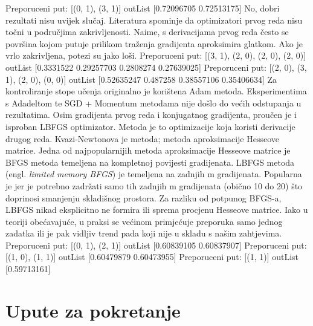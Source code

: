 Preporuceni put: [(0, 1), (3, 1)]\newline
outList [0.72096705 0.72513175]\newline
No, dobri rezultati nisu uvijek slučaj. Literatura spominje da optimizatori prvog reda nisu točni u područjima zakrivljenosti. Naime, s derivacijama prvog reda često se površina kojom putuje prilikom traženja gradijenta aproksimira glatkom. Ako je vrlo zakrivljena, potezi su jako loši.\newline
Preporuceni put: [(3, 1), (2, 0), (2, 0), (2, 0)]\newline
outList [0.3331522  0.29257703 0.2808274  0.27639025] \newline
Preporuceni put: [(2, 0), (3, 1), (2, 0), (0, 0)]\newline
outList [0.52635247 0.487258   0.38557106 0.35406634]\newline
Za kontroliranje stope učenja originalno je korištena Adam metoda. Eksperimentima s Adadeltom te SGD + Momentum metodama nije došlo do većih odstupanja u rezultatima. \newline
Osim gradijenta prvog reda i konjugatnog gradijenta, proučen je i isproban LBFGS optimizator. Metoda je to optimizacije koja koristi derivacije drugog reda. Kvazi-Newtonova je metoda; metoda aproksimacije Hesseove matrice.\newline
Jedna od najpopularnijih metoda aproksimacije Hesseove matrice je BFGS metoda temeljena na kompletnoj povijesti gradijenata. 
LBFGS metoda (engl. \textit{limited memory BFGS}) je temeljena na zadnjih m gradijenata. Popularna je jer je potrebno zadržati samo tih zadnjih m gradijenata (obično 10 do 20) što doprinosi smanjenju skladišnog prostora. Za razliku od potpunog BFGS-a, LBFGS nikad eksplicitno ne formira ili sprema procjenu Hesseove matrice.\newline
Iako u teoriji obećavajuće, u praksi se većinom primjećuje preporuka samo jednog zadatka ili je pak vidljiv trend pada koji nije u skladu s našim zahtjevima.
Preporuceni put: [(0, 1), (2, 1)]\newline
outList [0.60839105 0.60837907]\newline
Preporuceni put: [(1, 0), (1, 1)]\newline
outList [0.60479879 0.60473955]\newline
Preporuceni put: [(1, 1)]\newline
outList [0.59713161]\newline

\section{Upute za pokretanje}

